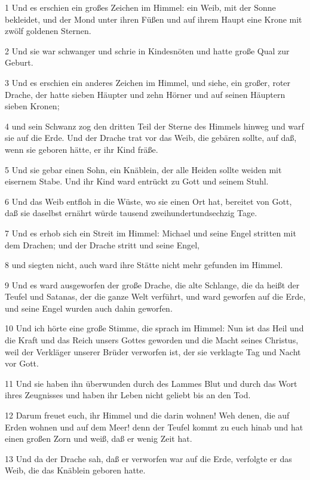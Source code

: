 \par 1 Und es erschien ein großes Zeichen im Himmel: ein Weib, mit der Sonne bekleidet, und der Mond unter ihren Füßen und auf ihrem Haupt eine Krone mit zwölf goldenen Sternen.
\par 2 Und sie war schwanger und schrie in Kindesnöten und hatte große Qual zur Geburt.
\par 3 Und es erschien ein anderes Zeichen im Himmel, und siehe, ein großer, roter Drache, der hatte sieben Häupter und zehn Hörner und auf seinen Häuptern sieben Kronen;
\par 4 und sein Schwanz zog den dritten Teil der Sterne des Himmels hinweg und warf sie auf die Erde. Und der Drache trat vor das Weib, die gebären sollte, auf daß, wenn sie geboren hätte, er ihr Kind fräße.
\par 5 Und sie gebar einen Sohn, ein Knäblein, der alle Heiden sollte weiden mit eisernem Stabe. Und ihr Kind ward entrückt zu Gott und seinem Stuhl.
\par 6 Und das Weib entfloh in die Wüste, wo sie einen Ort hat, bereitet von Gott, daß sie daselbst ernährt würde tausend zweihundertundsechzig Tage.
\par 7 Und es erhob sich ein Streit im Himmel: Michael und seine Engel stritten mit dem Drachen; und der Drache stritt und seine Engel,
\par 8 und siegten nicht, auch ward ihre Stätte nicht mehr gefunden im Himmel.
\par 9 Und es ward ausgeworfen der große Drache, die alte Schlange, die da heißt der Teufel und Satanas, der die ganze Welt verführt, und ward geworfen auf die Erde, und seine Engel wurden auch dahin geworfen.
\par 10 Und ich hörte eine große Stimme, die sprach im Himmel: Nun ist das Heil und die Kraft und das Reich unsers Gottes geworden und die Macht seines Christus, weil der Verkläger unserer Brüder verworfen ist, der sie verklagte Tag und Nacht vor Gott.
\par 11 Und sie haben ihn überwunden durch des Lammes Blut und durch das Wort ihres Zeugnisses und haben ihr Leben nicht geliebt bis an den Tod.
\par 12 Darum freuet euch, ihr Himmel und die darin wohnen! Weh denen, die auf Erden wohnen und auf dem Meer! denn der Teufel kommt zu euch hinab und hat einen großen Zorn und weiß, daß er wenig Zeit hat.
\par 13 Und da der Drache sah, daß er verworfen war auf die Erde, verfolgte er das Weib, die das Knäblein geboren hatte.
